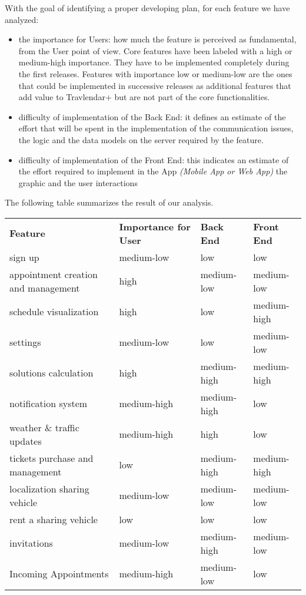 With the goal of identifying a proper developing plan, for each feature we have analyzed:
\begin{itemize}
	\item the importance for Users: how much the feature is perceived as fundamental, from the User point of view. Core features have been labeled with a high or medium-high importance. They have to be implemented completely during the first releases. Features with importance low or medium-low are the ones that could be implemented in successive releases as additional features that add value to Travlendar+ but are not part of the core functionalities.
	\item difficulty of implementation of the Back End: it defines an estimate of the effort that will be spent in the implementation of the communication issues, the logic and the data models on the server required by the feature.
	\item difficulty of implementation of the Front End: this indicates an estimate of the effort required to implement in the App \textit{(Mobile App or Web App)} the graphic and the user interactions
\end{itemize}

\noindent
The following table summarizes the result of our analysis.

\begin{center}
	\renewcommand{\arraystretch}{1.5}
	\begin{tabular}{|p{} l l l|}
		\hline
		\rowcolor{gray!45}
		\textbf{Feature} & \textbf{Importance for User} & \textbf{Back End} & \textbf{Front End}\\

		sign up 					& medium-low 	& low 			& low \\
		appointment creation and management	& high 	& medium-low	& medium-low \\
		schedule visualization		& high 			& low			& medium-high \\
		settings 					& medium-low 	& low			& medium-low \\
		solutions calculation 		& high 			& medium-high	& medium-high \\
		notification system 		& medium-high 	& medium-high	& low \\
		weather \& traffic updates 	& medium-high 	& high			& low \\
		tickets purchase and management	& low 		& medium-high	& medium-high \\
		localization sharing vehicle& medium-low 	& medium-low	& medium-low \\
		rent a sharing vehicle		& low 			& low			& low \\
		invitations					& medium-low	& medium-high	& medium-low \\
		Incoming Appointments		& medium-high	& medium-low	& low \\
		\hline
	\end{tabular}
\end{center}

